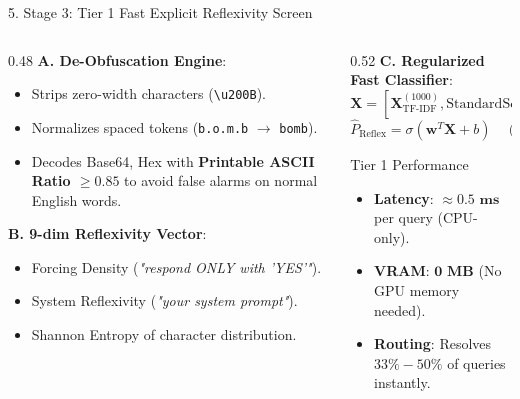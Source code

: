 \documentclass[aspectratio=169, 10pt]{beamer}
\begin{document}
\begin{frame}{5. Stage 3: Tier 1 Fast Explicit Reflexivity Screen}
    \begin{columns}[T]
        \begin{column}{0.48\textwidth}
            \textbf{A. De-Obfuscation Engine}:
            \begin{itemize}
                \item Strips zero-width characters (\texttt{\textbackslash u200B}).
                \item Normalizes spaced tokens (\texttt{b.o.m.b} $\to$ \texttt{bomb}).
                \item Decodes Base64, Hex with \textbf{Printable ASCII Ratio $\ge 0.85$} to avoid false alarms on normal English words.
            \end{itemize}

            \textbf{B. 9-dim Reflexivity Vector}:
            \begin{itemize}
                \item Forcing Density (\textit{"respond ONLY with 'YES'"}).
                \item System Reflexivity (\textit{"your system prompt"}).
                \item Shannon Entropy of character distribution.
            \end{itemize}
        \end{column}
        \begin{column}{0.52\textwidth}
            \textbf{C. Regularized Fast Classifier}:
            $$\mathbf{X} = \left[\mathbf{X}_{\text{TF-IDF}}^{(1000)}, \text{StandardScaler}\left(\mathbf{X}_{\text{Reflex}}^{(9)}\right)\right] \in \mathbb{R}^{N \times 1009}$$
            $$\hat{P}_{\text{Reflex}} = \sigma\left(\mathbf{w}^T \mathbf{X} + b\right) \quad (\text{Logistic Regression } C=1.0)$$

            \begin{exampleblock}{Tier 1 Performance}
                \begin{itemize}
                    \item \textbf{Latency}: $\approx \mathbf{0.5\text{ ms}}$ per query (CPU-only).
                    \item \textbf{VRAM}: $\mathbf{0\text{ MB}}$ (No GPU memory needed).
                    \item \textbf{Routing}: Resolves $33\% - 50\%$ of queries instantly.
                \end{itemize}
            \end{exampleblock}
        \end{column}
    \end{columns}
\end{frame}
\end{document}
